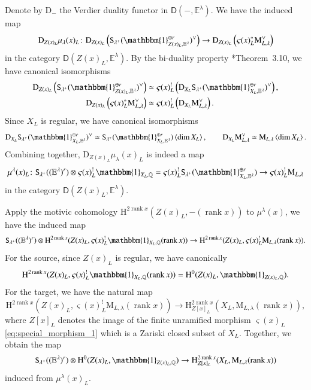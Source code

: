 \documentclass[12pt]{amsart}
\numberwithin{equation}{section}
\theoremstyle{plain}
\theoremstyle{definition}
\theoremstyle{remark}
\renewcommand{\d}[1]{\mathbb{#1}}
\renewcommand{\r}[1]{\mathrm{#1}}
\renewcommand{\sf}[1]{\mathsf{#1}}
\renewcommand{\(}{\left(}
\renewcommand{\)}{\right)}
\newcommand{\dE}{\d E}
\newcommand{\dQ}{\d Q}
\newcommand{\rD}{\r D}
\newcommand{\rH}{\r H}
\newcommand{\rM}{\r M}
\newcommand{\sfD}{\sf D}
\newcommand{\tS}{\mathtt{S}}
\newcommand{\llangle}{\left\langle}
\newcommand{\rrangle}{\right\rangle}
\DeclareMathOperator{\rank}{rank}
\begin{document}
Denote by $\rD_-$ the Verdier duality functor in $\sfD(-,\dE^\lambda)$. We have the induced map
\[
\rD_{Z(x)_L}\mu_\lambda(x)_L\colon\rD_{Z(x)_L}\(\tS_{\lambda^+}(\mathbbm{1}_{Z(x)_L,\dE^\lambda}^{\oplus r})^\vee\)
\to\rD_{Z(x)_L}\(\varsigma(x)_L^*\rM_{L,\lambda}^\vee\)
\]
in the category $\sfD(Z(x)_L,\dE^\lambda)$. By the bi-duality property \cite{Ayo}*{Theorem~3.10}, we have canonical isomorphisms
\begin{align*}
\rD_{Z(x)_L}\(\tS_{\lambda^+}(\mathbbm{1}_{Z(x)_L,\dE^\lambda}^{\oplus r})^\vee\)
&\simeq\varsigma(x)_L^!\(\rD_{X_L}\tS_{\lambda^+}(\mathbbm{1}_{X_L,\dE^\lambda}^{\oplus r})^\vee\), \\
\rD_{Z(x)_L}\(\varsigma(x)_L^*\rM_{L,\lambda}^\vee\)
&\simeq\varsigma(x)_L^!\(\rD_{X_L}\rM_{L,\lambda}^\vee\).
\end{align*}
Since $X_L$ is regular, we have canonical isomorphisms
\[
\rD_{X_L}\tS_{\lambda^+}(\mathbbm{1}_{X_L,\dE^\lambda}^{\oplus r})^\vee\simeq
\tS_{\lambda^+}(\mathbbm{1}_{X_L,\dE^\lambda}^{\oplus r})\llangle\dim X_L\rrangle,\qquad
\rD_{X_L}\rM_{L,\lambda}^\vee \simeq\rM_{L,\lambda}\llangle\dim X_L\rrangle.
\]
Combining together, $\rD_{Z(x)_L}\mu_\lambda(x)_L$ is indeed a map
\begin{align}\label{eq:special_map_motive_0}
\mu^\lambda(x)_L\colon\tS_{\lambda^+}((\dE^\lambda)^r)\otimes\varsigma(x)_L^!\mathbbm{1}_{X_L,\dQ}=
\varsigma(x)_L^!\tS_{\lambda^+}(\mathbbm{1}_{X_L,\dE^\lambda}^{\oplus r})
\to\varsigma(x)_L^!\rM_{L,\lambda}
\end{align}
in the category $\sfD(Z(x)_L,\dE^\lambda)$.




Apply the motivic cohomology $\rH^{2\rank x}(Z(x)_L,-(\rank x))$ to $\mu^\lambda(x)$, we have the induced map
\[
\tS_{\lambda^+}((\dE^\lambda)^r)\otimes\rH^{2\rank x}(Z(x)_L,\varsigma(x)_L^!\mathbbm{1}_{X_L,\dQ}(\rank x))
\to\rH^{2\rank x}(Z(x)_L,\varsigma(x)_L^!\rM_{L,\lambda}(\rank x)).
\]
For the source, since $Z(x)_L$ is regular, we have canonically
\[
\rH^{2\rank x}(Z(x)_L,\varsigma(x)_L^!\mathbbm{1}_{X_L,\dQ}(\rank x))=\rH^0(Z(x)_L,\mathbbm{1}_{Z(x)_L,\dQ}).
\]
For the target, we have the natural map
\[
\rH^{2\rank x}(Z(x)_L,\varsigma(x)_L^!\rM_{L,\lambda}(\rank x))
\to\rH^{2\rank x}_{Z[x]_L}(X_L,\rM_{L,\lambda}(\rank x)),
\]
where $Z[x]_L$ denotes the image of the finite unramified morphism $\varsigma(x)_L$ \eqref{eq:special_morphism_1} which is a Zariski closed subset of $X_L$. Together, we obtain the map
\begin{align}\label{eq:special_class}
\tS_{\lambda^+}((\dE^\lambda)^r)\otimes\rH^0(Z(x)_L,\mathbbm{1}_{Z(x)_L,\dQ})\to
\rH^{2\rank x}_{Z[x]_L}(X_L,\rM_{L,\lambda}(\rank x))
\end{align}
induced from $\mu^\lambda(x)_L$.
\end{document}
